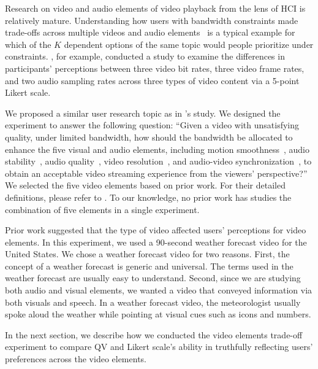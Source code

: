 Research on video and audio elements of video playback from the lens of HCI is relatively mature. Understanding how users with bandwidth constraints made trade-offs across multiple videos and audio elements~\cite{molnar2013comedy, oeldorf2012bad} is a typical example for which of the $K$ dependent options of the same topic would people prioritize under constraints. \textcite{oeldorf2012bad}, for example, conducted a study to examine the differences in participants' perceptions between three video bit rates, three video frame rates, and two audio sampling rates across three types of video content via a 5-point Likert scale. 

We proposed a similar user research topic as in \textcite{oeldorf2012bad}'s study. We designed the experiment to answer the following question: ``Given a video with unsatisfying quality, under limited bandwidth, how should the bandwidth be allocated to enhance the five visual and audio elements, including motion smoothness~\cite{huynh2008temporal}, audio stability~\cite{hardman1998successful}, audio quality~\cite{knoche2008low}, video resolution~\cite{knoche2005can}, and audio-video synchronization~\cite{steinmetz1996human}, to obtain an acceptable video streaming experience from the viewers' perspective?'' We selected the five video elements based on prior work. For their detailed definitions, please refer to . To our knowledge, no prior work has studies the combination of five elements in a single experiment.

Prior work suggested that the type of video affected users' perceptions for video elements. In this experiment, we used a 90-second weather forecast video for the United States. We chose a weather forecast video for two reasons. First, the concept of a weather forecast is generic and universal. The terms used in the weather forecast are usually easy to understand. Second, since we are studying both audio and visual elements, we wanted a video that conveyed information via both visuals and speech. In a weather forecast video, the meteorologist usually spoke aloud the weather while pointing at visual cues such as icons and numbers.

In the next section, we describe how we conducted the video elements trade-off experiment to compare QV and Likert scale's ability in truthfully reflecting users' preferences across the video elements.

